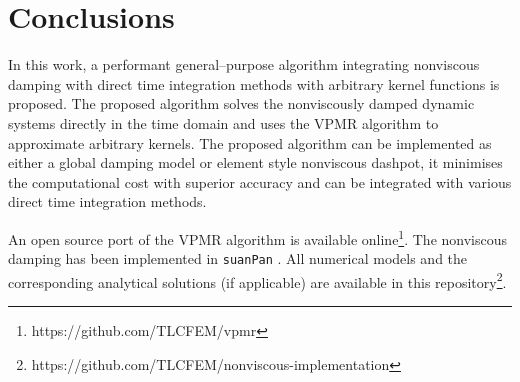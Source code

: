 \section{Conclusions}
In this work, a performant general--purpose algorithm integrating nonviscous damping with direct time integration methods with arbitrary kernel functions is proposed.
The proposed algorithm solves the nonviscously damped dynamic systems directly in the time domain and uses the VPMR algorithm to approximate arbitrary kernels.
The proposed algorithm can be implemented as either a global damping model or element style nonviscous dashpot, it minimises the computational cost with superior accuracy and can be integrated with various direct time integration methods.


An open source port of the VPMR algorithm is available online\footnote{https://github.com/TLCFEM/vpmr}.
The nonviscous damping has been implemented in \texttt{suanPan} \citep{Chang2023}. All numerical models and the corresponding analytical solutions (if applicable) are available in this repository\footnote{https://github.com/TLCFEM/nonviscous-implementation}.